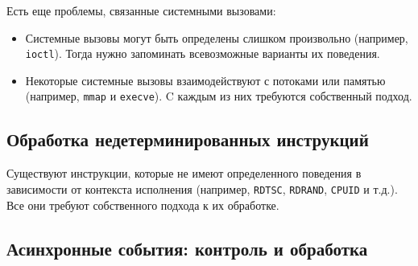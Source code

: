 Есть еще проблемы, связанные системными вызовами:

\begin{itemize}
  \item Системные вызовы могут быть определены слишком произвольно (например, \texttt{ioctl}). %
  Тогда нужно запоминать всевозможные варианты их поведения.
  \item Некоторые системные вызовы взаимодействуют с потоками или памятью (например, \texttt{mmap} и \texttt{execve}). 
  C каждым из них требуются собственный подход.
\end{itemize}




\subsection{Обработка недетерминированных инструкций}

Существуют инструкции, которые не имеют определенного поведения в зависимости от контекста исполнения 
(например, \texttt{RDTSC}, \texttt{RDRAND}, \texttt{CPUID} и т.д.). Все они требуют собственного подхода к их обработке.


\subsection{Асинхронные события: контроль и обработка}

